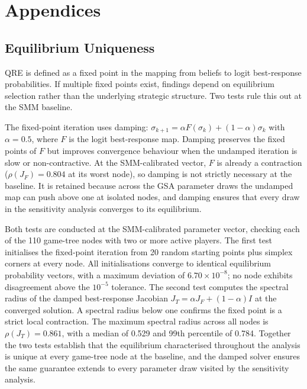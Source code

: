 \documentclass[10pt,a4paper]{article}
\begin{document}
\clearpage
\appendix
\section{Appendices}

\needspace{12em}
\subsection{Equilibrium Uniqueness}

QRE is defined as a fixed point in the mapping from beliefs to logit best-response probabilities. If multiple fixed points exist, findings depend on equilibrium selection rather than the underlying strategic structure. Two tests rule this out at the SMM baseline.

The fixed-point iteration uses damping: $\sigma_{k+1} = \alpha F(\sigma_k) + (1 - \alpha)\sigma_k$ with $\alpha = 0.5$, where $F$ is the logit best-response map. Damping preserves the fixed points of $F$ but improves convergence behaviour when the undamped iteration is slow or non-contractive. At the SMM-calibrated vector, $F$ is already a contraction ($\rho(J_F) = 0.804$ at its worst node), so damping is not strictly necessary at the baseline. It is retained because across the GSA parameter draws the undamped map can push above one at isolated nodes, and damping ensures that every draw in the sensitivity analysis converges to its equilibrium.

Both tests are conducted at the SMM-calibrated parameter vector, checking each of the 110 game-tree nodes with two or more active players. The first test initialises the fixed-point iteration from 20 random starting points plus simplex corners at every node. All initialisations converge to identical equilibrium probability vectors, with a maximum deviation of $6.70 \times 10^{-8}$; no node exhibits disagreement above the $10^{-5}$ tolerance. The second test computes the spectral radius of the damped best-response Jacobian $J_T = \alpha J_F + (1-\alpha) I$ at the converged solution. A spectral radius below one confirms the fixed point is a strict local contraction. The maximum spectral radius across all nodes is $\rho(J_T) = 0.861$, with a median of 0.529 and 99th percentile of 0.784. Together the two tests establish that the equilibrium characterised throughout the analysis is unique at every game-tree node at the baseline, and the damped solver ensures the same guarantee extends to every parameter draw visited by the sensitivity analysis.
\end{document}
